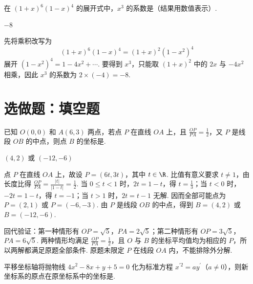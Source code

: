 \documentclass[UTF8,a4paper,oneside,11pt]{ctexbook}
\begin{document}
\begin{problem}
在 \((1+x)^6(1-x)^4\) 的展开式中，\(x^3\) 的系数是（结果用数值表示）\fillinblank{}.
\end{problem}

\begin{answer}
\(-8\)
\end{answer}

\begin{solution}
先将乘积改写为
\[
(1+x)^6(1-x)^4=(1+x)^2(1-x^2)^4
\]
展开 \((1-x^2)^4=1-4x^2+\cdots\). 要得到 \(x^3\)，只能取 \((1+x)^2\) 中的 \(2x\) 与 \(-4x^2\) 相乘，因此 \(x^3\) 的系数为 \(2\times(-4)=-8\).
\end{solution}

\section{选做题：填空题}

\begin{problem}[A]
已知 \(O(0,0)\) 和 \(A(6,3)\) 两点，若点 \(P\) 在直线 \(OA\) 上，且 \(\frac{OP}{PA}=\frac{1}{2}\)，又 \(P\) 是线段 \(OB\) 的中点，则点 \(B\) 的坐标是\fillinblank{}.
\end{problem}

\begin{answer}
\((4,2)\) 或 \((-12,-6)\)
\end{answer}

\begin{solution}
点 \(P\) 在直线 \(OA\) 上，故设 \(P=(6t,3t)\)，其中 \(t\in\R\). 比值有意义要求 \(t\neq1\)，由长度比得 \(\frac{OP}{PA}=\frac{|t|}{|1-t|}=\frac{1}{2}\). 当 \(0\leqslant t<1\) 时，\(2t=1-t\)，得 \(t=\frac{1}{3}\)；当 \(t<0\) 时，\(-2t=1-t\)，得 \(t=-1\)；当 \(t>1\) 时，\(2t=t-1\) 无解. 因而全部可能点为 \(P=(2,1)\) 或 \(P=(-6,-3)\). 由 \(P\) 是线段 \(OB\) 的中点，得到 \(B=(4,2)\) 或 \(B=(-12,-6)\).

回代验证：第一种情形有 \(OP=\sqrt5\)，\(PA=2\sqrt5\)；第二种情形有 \(OP=3\sqrt5\)，\(PA=6\sqrt5\). 两种情形均满足 \(\frac{OP}{PA}=\frac{1}{2}\)，且 \(O\) 与 \(B\) 的坐标平均值均为相应的 \(P\)，所以两解都满足原题全部条件. 原题未限定 \(P\) 在线段 \(OA\) 内，不能排除外分解.
\end{solution}

\begin{problem}[A]
平移坐标轴将抛物线 \(4x^{2}-8x+y+5=0\) 化为标准方程 \(x^{\prime2}=ay^{\prime}\)（\(a\neq0\)），则新坐标系的原点在原坐标系中的坐标是\fillinblank{}.
\end{problem}
\end{document}
